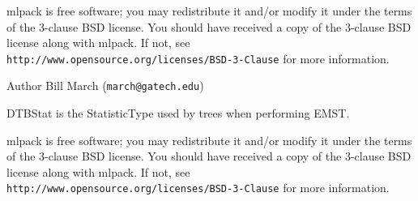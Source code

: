 mlpack is free software; you may redistribute it and/or modify it under the terms of the 3-\/clause B\+SD license. You should have received a copy of the 3-\/clause B\+SD license along with mlpack. If not, see {\tt http\+://www.\+opensource.\+org/licenses/\+B\+S\+D-\/3-\/\+Clause} for more information.

\begin{DoxyAuthor}{Author}
Bill March ({\tt march@gatech.\+edu})
\end{DoxyAuthor}
D\+T\+B\+Stat is the Statistic\+Type used by trees when performing E\+M\+ST.

mlpack is free software; you may redistribute it and/or modify it under the terms of the 3-\/clause B\+SD license. You should have received a copy of the 3-\/clause B\+SD license along with mlpack. If not, see {\tt http\+://www.\+opensource.\+org/licenses/\+B\+S\+D-\/3-\/\+Clause} for more information. 